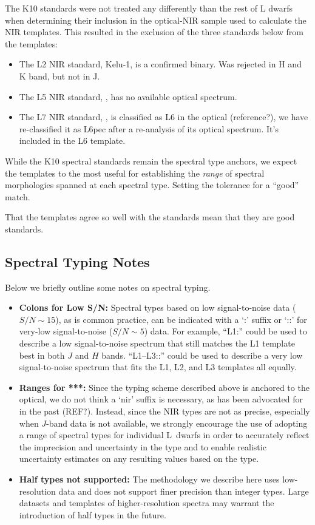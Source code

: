 \documentclass[12pt,preprint]{aastex}
\begin{document}
The K10 standards were not treated any differently than the rest of L dwarfs when determining their inclusion in the optical-NIR sample used to calculate the NIR templates. This resulted in the exclusion of the three standards below from the templates:
\begin{itemize}
	\item The L2 NIR standard,  Kelu-1, is a confirmed binary. Was rejected in H and K band, but not in J.
	\item The L5 NIR standard, , has no available optical spectrum. 
	\item The L7 NIR standard, , is classified as L6 in the optical (reference?), we have re-classified it as L6pec after a re-analysis of its optical spectrum. It's included in the L6 template.
\end{itemize}

While the K10 spectral standards remain the spectral type anchors, we expect the templates to the most useful for establishing the \emph{range} of spectral morphologies spanned at each spectral type.
Setting the tolerance for a ``good'' match.

That the templates agree so well with the standards mean that they are good standards.

\subsection{Spectral Typing Notes}

Below we briefly outline some notes on spectral typing.

\begin{itemize}
	\item{\textbf{Colons for Low S/N:}} Spectral types based on low signal-to-noise data ($S/N\sim15$), as is common practice, can be indicated with a `:' suffix or `::' for very-low signal-to-noise ($S/N\sim5$) data. For example, ``L1:'' could be used to describe a low signal-to-noise spectrum that still matches the L1 template best in both $J$ and $H$ bands. ``L1--L3::'' could be used to describe a very low signal-to-noise spectrum that fits the L1, L2, and L3 templates all equally.
	
	\item{\textbf{Ranges for ***:}} Since the typing scheme described above is anchored to the optical, we do not think a `nir' suffix is necessary, as has been advocated for in the past (REF?). Instead, since the NIR types are not as precise, especially when $J$-band data is not available, we strongly encourage the use of adopting a range of spectral types for individual L~dwarfs in order to accurately reflect the imprecision and uncertainty in the type and to enable realistic uncertainty estimates on any resulting values based on the type. 

	\item{\textbf{Half types not supported:}} The methodology we describe here uses low-resolution data and does not support finer precision than integer types. Large datasets and templates of higher-resolution spectra may warrant the introduction of half types in the future.
\end{itemize}
\end{document}
